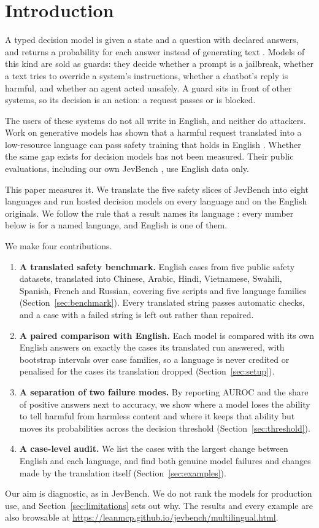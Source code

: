 \section{Introduction}

A typed decision model is given a state and a question with declared answers,
and returns a probability for each answer instead of generating text
\citep{pai2026jevbench}. Models of this kind are sold as guards: they decide
whether a prompt is a jailbreak, whether a text tries to override a system's
instructions, whether a chatbot's reply is harmful, and whether an agent acted
unsafely. A guard sits in front of other systems, so its decision is an action:
a request passes or is blocked.

The users of these systems do not all write in English, and neither do
attackers. Work on generative models has shown that a harmful request
translated into a low-resource language can pass safety training that holds in
English \citep{yong2023lowresource,deng2023multilingualjailbreak,wang2023alllanguages}.
Whether the same gap exists for decision models has not been measured. Their
public evaluations, including our own JevBench \citep{pai2026jevbench}, use
English data only.

This paper measures it. We translate the five safety slices of JevBench into
eight languages and run \MLnModels{} hosted decision models on every language and
on the English originals. We follow the rule that a result names its language
\citep{ducel2022benderrule}: every number below is for a named language, and
English is one of them.

We make four contributions.

\begin{enumerate}
  \item \textbf{A translated safety benchmark.} \MLnCasesEN{} English cases from
  five public safety datasets, translated into Chinese, Arabic, Hindi,
  Vietnamese, Swahili, Spanish, French and Russian, covering five scripts and
  five language families (Section~\ref{sec:benchmark}). Every
  translated string passes automatic checks, and a case with a failed string is
  left out rather than repaired.
  \item \textbf{A paired comparison with English.} Each model is compared with
  its own English answers on exactly the cases its translated run answered, with
  bootstrap intervals over case families, so a language is never credited or
  penalised for the cases its translation dropped (Section~\ref{sec:setup}).
  \item \textbf{A separation of two failure modes.} By reporting AUROC and the
  share of positive answers next to accuracy, we show where a model loses the
  ability to tell harmful from harmless content and where it keeps that ability
  but moves its probabilities across the decision threshold
  (Section~\ref{sec:threshold}).
  \item \textbf{A case-level audit.} We list the cases with the largest change
  between English and each language, and find both genuine model failures and
  changes made by the translation itself (Section~\ref{sec:examples}).
\end{enumerate}

Our aim is diagnostic, as in JevBench. We do not rank the models for production
use, and Section~\ref{sec:limitations} sets out why. The results and every
example are also browsable at
\url{https://leanmcp.github.io/jevbench/multilingual.html}.
